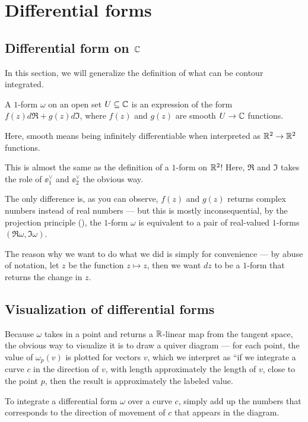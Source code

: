 \chapter{Differential forms}

\section{Differential form on $\mathbb C$}

In this section, we will generalize the definition of what can be contour integrated.

\begin{definition}
	A $1$-form $\omega$ on an open set $U \subseteq \mathbb C$ is an expression of the form
	$f(z) d \Re + g(z) d \Im$, where $f(z)$ and $g(z)$ are
	smooth $U \to \mathbb C$ functions.
\end{definition}

Here, smooth means being infinitely differentiable when interpreted as $\mathbb R^2 \to \mathbb R^2$ functions.

This is almost the same as the definition of a $1$-form on $\mathbb R^2$!
Here, $\Re$ and $\Im$ takes the role of $\ee_1^\vee$ and $\ee_2^\vee$ the obvious way.

The only difference is, as you can observe, $f(z)$ and $g(z)$ returns complex numbers instead of
real numbers --- but this is mostly inconsequential, by the projection principle
(), the $1$-form $\omega$ is equivalent to a pair of real-valued
$1$-forms $(\Re \omega, \Im \omega)$.

The reason why we want to do what we did is simply for convenience --- by abuse of notation,
let $z$ be the function $z \mapsto z$,
then we want $dz$ to be a $1$-form that returns the change in $z$.

\section{Visualization of differential forms}

Because $\omega$ takes in a point and returns a $\mathbb R$-linear map from the tangent space,
the obvious way to visualize it is to draw a quiver diagram --- for each point, the value of
$\omega_p(v)$ is plotted for vectors $v$, which we interpret as ``if we integrate a curve $c$ in the
direction of $v$, with length approximately the length of $v$, close to the point $p$, then the
result is approximately the labeled value.

To integrate a differential form $\omega$ over a curve $c$, simply add up the numbers that
corresponds to the direction of movement of $c$ that appears in the diagram.

